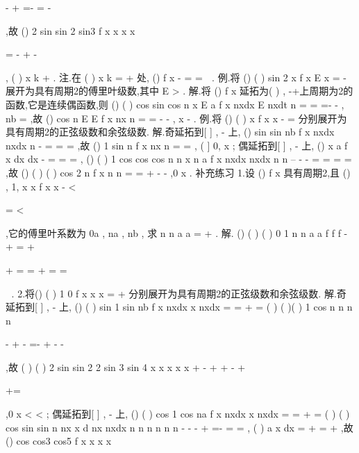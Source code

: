 -
+
=-
=
-




\int 
,故 
()
2 sin
sin 2
sin3
f x
x
x
x


=
-
+
-




\Lambda ,
(
)
x
k
\pi 
\neq 
+
. 
\textcolor{lyred}{注}.在
(
)
x
k
\pi 
=
+
处,
()
f x
\pi 
\pi 
-
=
=

. 
\textcolor{lyred}{例}.将
()
(
)
sin 2
x
f x
E
x
\pi 
\pi 
=
-
\le 
\le 
展开为具有周期2\pi 的傅里叶级数,其中
E >
. 
解.将
()
f x 延拓为(
)
,
-\infty +\infty 上周期为2\pi 的函数,它是连续偶函数,则 
()
(
)
cos
sin
cos
n
x
E
a
f x
nxdx
E
nxdt
n
\pi 
\pi 
\pi 
\pi 
\pi 
=
=
=-
-
\int 
\int 
,
nb =
,故 
()
cos
n
E
E
f x
nx
n
\pi 
\pi 
\infty 
=
=
-
-
\sum 
,
x
\pi 
\pi 
-
\le 
\le 
. 
\textcolor{lyred}{例}.将
()
(
)
x
f x
x
\pi 
\pi 
-
=
\le 
\le 
分别展开为具有周期2\pi 的正弦级数和余弦级数. 
解.奇延拓到[
]
,
\pi \pi 
-
上,
()
sin
sin
nb
f x
nxdx
nxdx
n
\pi 
\pi \pi 
\pi 
\pi 
-
=
=
=
\int 
\int 
,故 
()
1 sin
n
f x
nx
n
\infty 
=
=\sum 
,
(
]
0,
x
\pi 
\in 
; 
偶延拓到[
]
,
\pi \pi 
-
上,
()
x
a
f x dx
dx
\pi 
\pi \pi 
\pi 
\pi 
\pi 
-
=
=
=
\int 
\int 
, 
()
(
)
1 cos
cos
cos
n
n
x
n
a
f x
nxdx
nxdx
n
n
\pi 
\pi \pi 
\pi 
\pi 
\pi 
\pi 
\pi 
--
-
-
=
=
=
=
\int 
\int 
,故 
()
(
)
(
)
cos 2
n
f x
n
n
\pi 
\pi 
\pi 
\infty 
=
=
+
-
-
\sum 
,0
x
\pi 
\le 
\le 
. 
\textcolor{lyred}{补充练习 }
1.设
()
f x 具有周期2\pi ,且
()
,
1,
x
x
f x
x
\pi 
\pi 
-
\le 
<

=
\le 
<

,它的傅里叶系数为
0a ,
na ,
nb , 
求
n
n
a
a
\infty 
=
+\sum 
. 
解.
()
(
)
(
)
0 1
n
n
a
a
f
f
f
\infty 
-
+
=
+


+
=
=
+
=
=


\sum 

. 
2.将()
(
)
1 0
f
x
x
x
\pi 
=
+
\le 
\le 
分别展开为具有周期2\pi 的正弦级数和余弦级数. 
解.奇延拓到[
]
,
\pi \pi 
-
上,
()
(
)
sin
1 sin
nb
f x
nxdx
x
nxdx
\pi 
\pi 
\pi 
\pi 
=
=
+
=
\int 
\int 
(
)
(
)(
)
1 cos
n
n
n
n
\pi 
\pi 
\pi 
\pi 
\pi 


-
+
-
=-
+
-
-





,故 
(
)
(
)
2 sin
sin 2
2 sin 3
sin 4
x
x
x
x
x
\pi 
\pi 
\pi 
\pi 
\pi 
+
-
+
+
-
+


+=




\Lambda ,0
x
\pi 
<
<
; 
偶延拓到[
]
,
\pi \pi 
-
上,
()
(
)
cos
1 cos
na
f x
nxdx
x
nxdx
\pi 
\pi 
\pi 
\pi 
=
=
+
=
\int 
\int 
(
)
(
)
cos
sin
sin
n
nx
x
d
nx
nxdx
n
n
n
n
n
n
\pi 
\pi 
\pi 
\pi 
\pi 
\pi 
-
-
-
+
=-
=
\cdots 
=
\cdots 
\int 
\int 
, 
(
)
a
x
dx
\pi 
\pi 
\pi 
=
+
=
+
\int 
,故 
()
cos
cos3
cos5
f x
x
x
x
\pi 
\pi 


